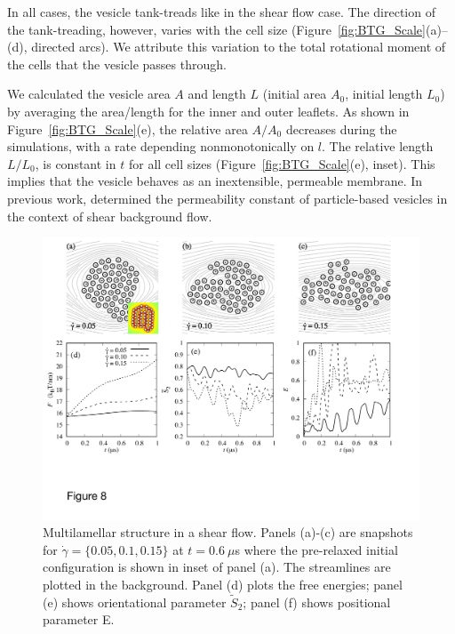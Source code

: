\documentclass[aps,prl,preprint,groupedaddress]{revtex4-2}
\begin{document}
In all cases, the vesicle tank-treads like in the shear flow case.
The direction of the tank-treading, however, varies with the cell
size (Figure~\ref{fig:BTG_Scale}(a)--(d), directed arcs).  We attribute
this variation to the total rotational moment of the cells that the vesicle
passes through.

We calculated the vesicle area $A$ and length $L$ (initial area $A_0$, initial length $L_0$)
by averaging the area/length for the inner and outer leaflets.  
As shown in Figure~\ref{fig:BTG_Scale}(e),
the relative area $A/A_0$ decreases during the simulations, with a rate
depending nonmonotonically on $l$.  
The relative length $L/L_0$, is constant in $t$ for all cell sizes (Figure~\ref{fig:BTG_Scale}(e), inset).
This implies that the vesicle behaves as an inextensible, permeable membrane.
In previous work, \cite{Fu2022_JFM} determined the permeability constant of particle-based vesicles
in the context of shear background flow.



\begin{figure}
  \begin{center}
\includegraphics[width=1.0\textwidth]{Figures/Figure8.pdf}
  \end{center}
  \vspace{-20pt}  
  \caption{\label{fig:BC2_shear}
Multilamellar structure in a shear flow. Panels (a)-(c) are snapshots for $\dot \gamma = \{0.05, 0.1, 0.15\}$ at $t=0.6\ \mu$s where the pre-relaxed initial configuration is shown in inset of panel (a). The streamlines are plotted in the background.
Panel (d) plots the free energies; panel (e) shows orientational parameter $\tilde{S}_2$; panel (f) shows positional parameter E.
       }
\end{figure}
\end{document}
